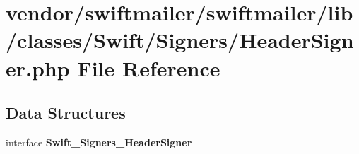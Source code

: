 \section{vendor/swiftmailer/swiftmailer/lib/classes/\+Swift/\+Signers/\+Header\+Signer.php File Reference}
\label{_header_signer_8php}
\subsection*{Data Structures}
\begin{DoxyCompactItemize}
\item 
interface {\bf Swift\+\_\+\+Signers\+\_\+\+Header\+Signer}
\end{DoxyCompactItemize}
